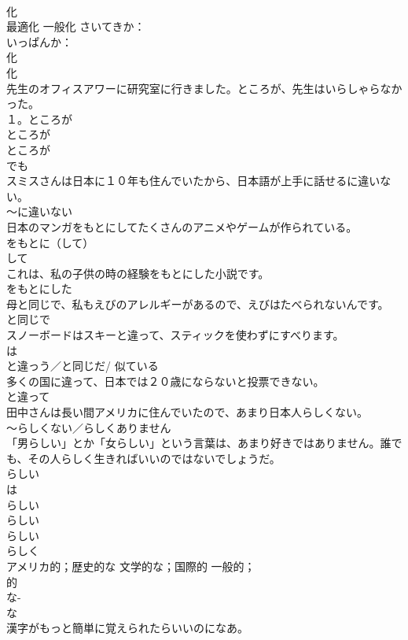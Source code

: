 \documentclass[8pt]{extreport}
\begin{document}
\begin{CJK}{UTF8}{min}
{\\	化 
\\	最適化 一般化	さいてきか：
\\	いっぱんか：
\\	化 
\\	化 
\\	先生のオフィスアワーに研究室に行きました。ところが、先生はいらしゃらなかった。	
\\	１。ところが　
\\	ところが 
\\	ところが
\\	でも 
\\	スミスさんは日本に１０年も住んでいたから、日本語が上手に話せるに違いない。	
\\	〜に違いない 
\\	日本のマンガをもとにしてたくさんのアニメやゲームが作られている。	
\\	をもとに（して） 
\\	して 
\\	これは、私の子供の時の経験をもとにした小説です。	
\\	をもとにした 
\\	母と同じで、私もえびのアレルギーがあるので、えびはたべられないんです。	
\\	と同じで 
\\	スノーボードはスキーと違って、スティックを使わずにすべります。	
\\	は
\\	と違っう／と同じだ/ 似ている 
\\	多くの国に違って、日本では２０歳にならないと投票できない。	
\\	と違って 
\\	田中さんは長い間アメリカに住んでいたので、あまり日本人らしくない。	
\\	〜らしくない／らしくありません 
\\	「男らしい」とか「女らしい」という言葉は、あまり好きではありません。誰でも、その人らしく生きればいいのではないでしょうだ。	
\\	らしい 
\\	は
\\	らしい 
\\	らしい 
\\	らしい 
\\	らしく 
\\	アメリカ的；歴史的な 文学的な；国際的 一般的；	
\\	的 
\\	な-
\\	な 
\\	漢字がもっと簡単に覚えられたらいいのになあ。	
}
\end{CJK}
\end{document}
